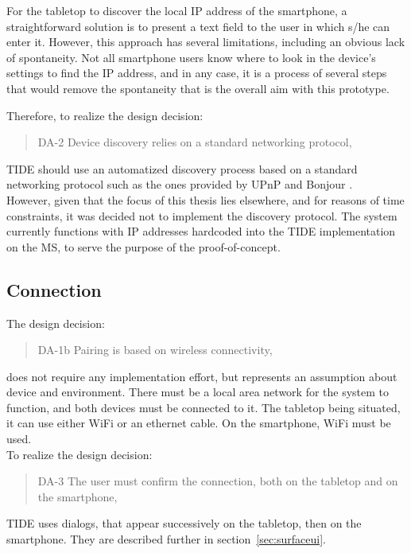 For the tabletop to discover the local IP address of the smartphone, a straightforward solution is to present a text field to the user in which s/he can enter it.
However, this approach has several limitations, including an obvious lack of spontaneity.
Not all smartphone users know where to look in the device's settings to find the IP address, and in any case, it is a process of several steps that would remove the spontaneity that is the overall aim with this prototype.

Therefore, to realize the design decision:
\begin{quote}
DA-2 Device discovery relies on a standard networking protocol,
\end{quote}
TIDE should use an automatized discovery process based on a standard networking protocol such as the ones provided by UPnP \citep{upnp} and Bonjour \citep{bonjour}.
\\
\linebreak
However, given that the focus of this thesis lies elsewhere, 
 and for reasons of time constraints, it was decided not to implement the discovery protocol.
The system currently functions with IP addresses hardcoded into the TIDE implementation on the MS, to serve the purpose of the proof-of-concept.

\subsection{Connection}

The design decision:
\begin{quote}
DA-1b Pairing is based on wireless connectivity,
\end{quote}
does not require any implementation effort, but represents an assumption about device and environment.
There must be a local area network for the system to function, and both devices must be connected to it.
The tabletop being situated, it can use either WiFi or an ethernet cable.
On the smartphone, WiFi must be used.
\\
\linebreak
To realize the design decision:
\begin{quote}
DA-3 The user must confirm the connection, both on the tabletop and on the smartphone,
\end{quote}
TIDE uses dialogs, that appear successively on the tabletop, then on the smartphone.
They are described further in section~\ref{sec:surfaceui}.

